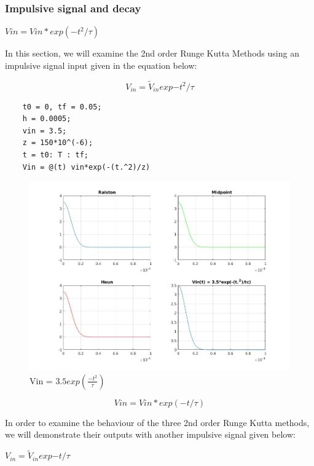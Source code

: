 \documentclass[11pt,a4paper]{article}
\begin{document}
\newpage
\subsubsection{Impulsive signal and decay}
$Vin = Vin*exp(-t^2/\tau)$


In this section, we will examine the 2nd order Runge Kutta Methods using an impulsive signal input given in the equation below:

 \begin{equation}
V_{in} = \tilde{V}_{in}  exp{-t^2/\tau}
\end{equation}

 \begin{verbatim}
    t0 = 0, tf = 0.05;
    h = 0.0005;
    vin = 3.5;
    z = 150*10^(-6);
    t = t0: T : tf;
    Vin = @(t) vin*exp(-(t.^2)/z)
    \end{verbatim}

	\begin{figure}[h]
		\includegraphics[width=\textwidth]{Ex1_Figs/subt2.jpg}
		\vspace{-6mm}
		\caption{Vin = $3.5exp(\frac{-t^2}{\tau})$}
		\label{fig:RL3}
	\end{figure}



\newpage

\[Vin = Vin*exp(-t/\tau)\]

In order to examine the behaviour of the three 2nd order Runge Kutta methods, we will demonstrate their outputs with another impulsive signal given below:


$V_{in} = \tilde{V}_{in}  exp{-t/\tau}$
\end{document}
